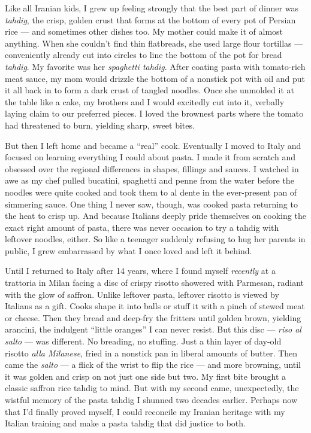 Like all Iranian kids, I grew up feeling strongly that the best part of
dinner was \emph{tahdig}, the crisp, golden crust that forms at the
bottom of every pot of Persian rice --- and sometimes other dishes too.
My mother could make it of almost anything. When she couldn't find thin
flatbreads, she used large flour tortillas --- conveniently already cut
into circles to line the bottom of the pot for bread \emph{tahdig}. My
favorite was her \emph{spaghetti tahdig}. After coating pasta with
tomato-rich meat sauce, my mom would drizzle the bottom of a nonstick
pot with oil and put it all back in to form a dark crust of tangled
noodles. Once she unmolded it at the table like a cake, my brothers and
I would excitedly cut into it, verbally laying claim to our preferred
pieces. I loved the brownest parts where the tomato had threatened to
burn, yielding sharp, sweet bites.

But then I left home and became a ``real'' cook. Eventually I moved to
Italy and focused on learning everything I could about pasta. I made it
from scratch and obsessed over the regional differences in shapes,
fillings and sauces. I watched in awe as my chef pulled bucatini,
spaghetti and penne from the water before the noodles were quite cooked
and took them to al dente in the ever-present pan of simmering sauce.
One thing I never saw, though, was cooked pasta returning to the heat to
crisp up. And because Italians deeply pride themselves on cooking the
exact right amount of pasta, there was never occasion to try a tahdig
with leftover noodles, either. So like a teenager suddenly refusing to
hug her parents in public, I grew embarrassed by what I once loved and
left it behind.

Until I returned to Italy after 14 years, where I found myself
\emph{recently} at a trattoria in Milan facing a disc of crispy risotto
showered with Parmesan, radiant with the glow of saffron. Unlike
leftover pasta, leftover risotto is viewed by Italians as a gift. Cooks
shape it into balls or stuff it with a pinch of stewed meat or cheese.
Then they bread and deep-fry the fritters until golden brown, yielding
arancini, the indulgent ``little oranges'' I can never resist. But this
disc --- \emph{riso al salto} --- was different. No breading, no
stuffing. Just a thin layer of day-old risotto \emph{alla Milanese},
fried in a nonstick pan in liberal amounts of butter. Then came the
\emph{salto} --- a flick of the wrist to flip the rice --- and more
browning, until it was golden and crisp on not just one side but two. My
first bite brought a classic saffron rice tahdig to mind. But with my
second came, unexpectedly, the wistful memory of the pasta tahdig I
shunned two decades earlier. Perhaps now that I'd finally proved myself,
I could reconcile my Iranian heritage with my Italian training and make
a pasta tahdig that did justice to both.

